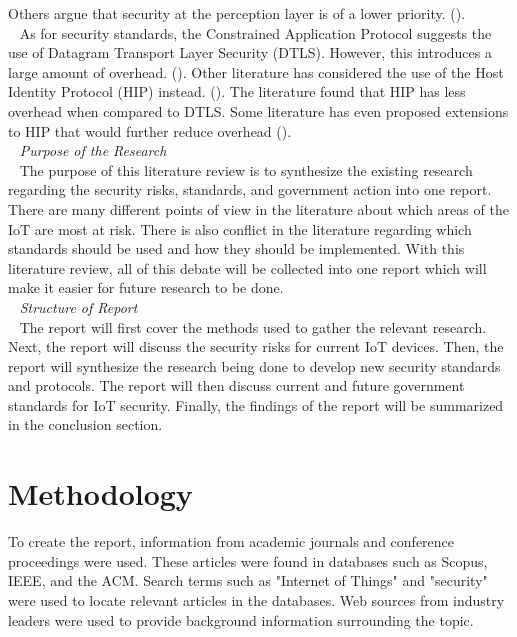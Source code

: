 \documentclass[letterpaper, 12pt]{article}
\begin{document}
\begin{flushleft}
Others argue that security at the perception layer is of a lower priority. (\cite{Kozlov}). \\
~\newline
As for security standards, the Constrained Application Protocol suggests the use of Datagram Transport Layer Security (DTLS). However, this introduces a large amount of overhead. (\cite{Capossele}).  
Other literature has considered the use of the Host Identity Protocol (HIP) instead. (\cite{Garcia-Morchon:2013:SII:2462096.2462117}). The literature found that HIP has less overhead when compared to
DTLS. Some literature has even proposed extensions to HIP that would further reduce overhead (\cite{Hummen}).\\
~\newline
\textit{Purpose of the Research}\\
~\newline
The purpose of this literature review is to synthesize the existing research regarding the security risks, standards, and government action into one report. There are many different points of view in the
literature about which areas of the IoT are most at risk. There is also conflict in the literature regarding which standards should be used and how they should be implemented. With this literature review,
all of this debate will be collected into one report which will make it easier for future research to be done. \\
~\newline
\textit{Structure of Report}\\
~\newline
The report will first cover the methods used to gather the relevant research. Next, the report will discuss the security risks for current IoT devices. Then, the report will synthesize the research being
done to develop new security standards and protocols. The report will then discuss current and future government standards for IoT security. Finally, the findings of the report will be summarized in the conclusion
section.

\section*{Methodology}

To create the report, information from academic journals and conference proceedings were used. These articles were found in 
databases such as Scopus, IEEE, and the ACM. Search terms such as "Internet of Things" and "security" were used to locate
relevant articles in the databases. Web sources from industry leaders were used to provide background information surrounding
the topic.\\ 



\end{flushleft}
\end{document}
